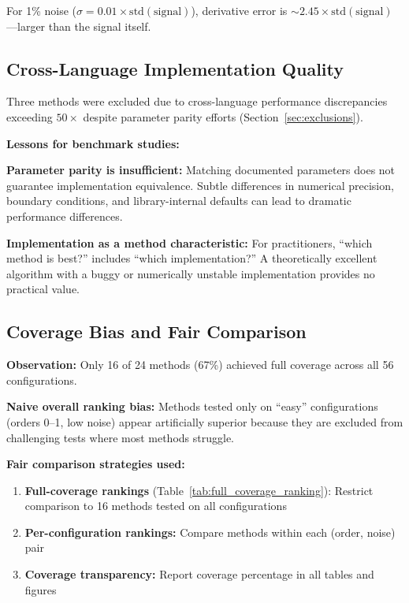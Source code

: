 For 1\% noise ($\sigma = 0.01 \times \text{std}(\text{signal})$), derivative error is $\sim 2.45 \times \text{std}(\text{signal})$---larger than the signal itself.

\subsection{Cross-Language Implementation Quality}
\label{sec:cross_language}

Three methods were excluded due to cross-language performance discrepancies exceeding $50\times$ despite parameter parity efforts (Section~\ref{sec:exclusions}).

\textbf{Lessons for benchmark studies:}

\textbf{Parameter parity is insufficient:}
Matching documented parameters does not guarantee implementation equivalence. Subtle differences in numerical precision, boundary conditions, and library-internal defaults can lead to dramatic performance differences.

\textbf{Implementation as a method characteristic:}
For practitioners, ``which method is best?'' includes ``which implementation?'' A theoretically excellent algorithm with a buggy or numerically unstable implementation provides no practical value.

\subsection{Coverage Bias and Fair Comparison}
\label{sec:coverage_bias_discussion}

\textbf{Observation:} Only 16 of 24 methods (67\%) achieved full coverage across all 56 configurations.

\textbf{Naive overall ranking bias:}
Methods tested only on ``easy'' configurations (orders 0--1, low noise) appear artificially superior because they are excluded from challenging tests where most methods struggle.

\textbf{Fair comparison strategies used:}
\begin{enumerate}
    \item \textbf{Full-coverage rankings} (Table~\ref{tab:full_coverage_ranking}): Restrict comparison to 16 methods tested on all configurations
    \item \textbf{Per-configuration rankings:} Compare methods within each (order, noise) pair
    \item \textbf{Coverage transparency:} Report coverage percentage in all tables and figures
\end{enumerate}

